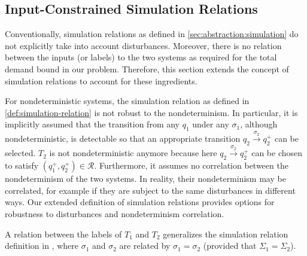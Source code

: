 \subsection{Input-Constrained Simulation Relations}
\label{sec:abstraction:ext-simulation}

Conventionally, simulation relations as defined in \cref{sec:abstraction:simulation} do not explicitly take into account %
disturbances.  Moreover, there is no relation between the inputs (or labels) to the two systems as required for the total demand bound in our problem.  Therefore, this section extends the concept of simulation relations to account for these ingredients.

\begin{remark}
  For nondeterministic systems, the simulation relation as defined in
  \cref{def:simulation-relation} is not robust to the
  nondeterminism. In particular, it is implicitly assumed that the transition
  from any $q_1$ under any $\sigma_1$, although nondeterministic, is
  detectable so that an appropriate transition $q_2 \xrightarrow{\sigma_2}
  q^+_2$ can be selected. $T_2$ is not nondeterministic anymore because here
  $q_2 \xrightarrow{\sigma_2} q^+_2$ can be chosen to satisfy $(q_1^+, q_2^+)
  \in \mathcal{R}$. Furthermore, it assumes no correlation between the
  nondeterminism of the two systems. In reality, their nondeterminism may be
  correlated, for example if they are subject to the same disturbances in
  different ways. Our extended definition of simulation relations provides
  options for robustness to disturbances and nondeterminism correlation.
\end{remark}

\begin{remark}
  A relation between the labels of $T_1$ and $T_2$ generalizes the simulation
  relation definition in {\cite{girardetal07amd}}, where $\sigma_1$ and
  $\sigma_2$ are related by $\sigma_1 = \sigma_2$ (provided that $\Sigma_1 =
  \Sigma_2$).
\end{remark}

